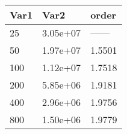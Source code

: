 \begin{tabular}{lll}
Var1 & Var2 & order \\ 
\hline 
25 & 3.05e+07 & ------ \\ 
50 & 1.97e+07 & 1.5501 \\ 
100 & 1.12e+07 & 1.7518 \\ 
200 & 5.85e+06 & 1.9181 \\ 
400 & 2.96e+06 & 1.9756 \\ 
800 & 1.50e+06 & 1.9779 \\ 
\hline 
\end{tabular}
